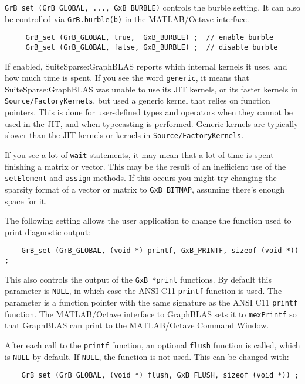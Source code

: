 \verb'GrB_set (GrB_GLOBAL, ..., GxB_BURBLE)' controls the burble setting.  It can also be
controlled via \verb'GrB.burble(b)' in the MATLAB/Octave interface.

{\footnotesize
\begin{verbatim}
     GrB_set (GrB_GLOBAL, true,  GxB_BURBLE) ;  // enable burble
     GrB_set (GrB_GLOBAL, false, GxB_BURBLE) ;  // disable burble \end{verbatim}}

If enabled, SuiteSparse:GraphBLAS reports which internal kernels it uses, and
how much time is spent.  If you see the word \verb'generic', it means that
SuiteSparse:GraphBLAS was unable to use its JIT kernels, or its faster kernels
in \verb'Source/FactoryKernels', but used a generic kernel that relies on
function pointers.  This is done for user-defined types and operators when they
cannot be used in the JIT, and when typecasting is performed.  Generic kernels
are typically slower than the JIT kernels or kernels in
\verb'Source/FactoryKernels'.

If you see a lot of \verb'wait' statements, it may mean that a lot of time is
spent finishing a matrix or vector.  This may be the result of an inefficient
use of the \verb'setElement' and \verb'assign' methods.  If this occurs you
might try changing the sparsity format of a vector or matrix to
\verb'GxB_BITMAP', assuming there's enough space for it.

The following setting allows the user application to change the
function used to print diagnostic output:

{\small
\begin{verbatim}
    GrB_set (GrB_GLOBAL, (void *) printf, GxB_PRINTF, sizeof (void *)) ; \end{verbatim} }

This also controls the output of the
\verb'GxB_*print' functions.  By default this parameter is \verb'NULL', in
which case the ANSI C11 \verb'printf' function is used.  The parameter is a
function pointer with the same signature as the ANSI C11 \verb'printf'
function.  The MATLAB/Octave interface to GraphBLAS sets it to \verb'mexPrintf'
so that GraphBLAS can print to the MATLAB/Octave Command Window.

After each call to the \verb'printf' function, an optional
\verb'flush' function is called, which is \verb'NULL' by default.  If
\verb'NULL', the function is not used.  This can be changed with:

{\small
\begin{verbatim}
    GrB_set (GrB_GLOBAL, (void *) flush, GxB_FLUSH, sizeof (void *)) ; \end{verbatim} }

